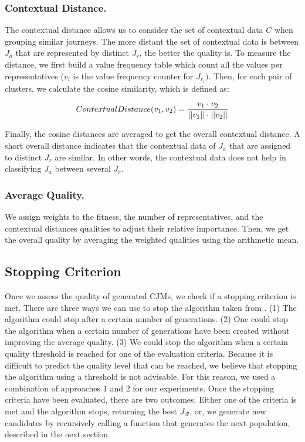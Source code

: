 \documentclass[runningheads]{llncs}
\begin{document}
{%
\label{contextual-distance}
\subsubsection{Contextual Distance.} The contextual distance allows us to consider the set of contextual data $C$ when grouping similar journeys. The more distant the set of contextual data is between $J_a$ that are represented by distinct $J_r$, the better the quality is. To measure the distance, we first build a value frequency table which count all the values per representatives (${v_i}$ is the value frequency counter for $J_{r_i})$. Then, for each pair of clusters, we calculate the cosine similarity, which is defined as:

\begin{equation}
\footnotesize
    ContextualDistance({v_{1}}, {v_{2}}) = \frac{v_{1} \cdot v_{2}}{||v_{1} ||\cdot||v_{2}||} 
\end{equation}

Finally, the cosine distances are averaged to get the overall contextual distance. A short overall distance indicates that the contextual data of $J_a$ that are assigned to distinct $J_r$ are similar. In other words, the contextual data does not help in classifying $J_a$ between several $J_r$. 

\subsubsection{Average Quality. } We assign weights to the fitness, the number of representatives, and the contextual distances qualities to adjust their relative importance. Then, we get the overall quality by averaging the weighted qualities using the arithmetic mean. 

\subsection{Stopping Criterion}
{Once we assess the quality of generated CJMs, we check if a stopping criterion is met.} There are three ways we can use to stop the algorithm taken from \cite{buijs2012genetic,de2005genetic}. (1) The algorithm could stop after a certain number of generations. (2) One could stop the algorithm when a certain number of generations have been created without improving the average quality. (3) We could stop the algorithm when a certain quality threshold is reached for one of the evaluation criteria. Because it is difficult to predict the quality level that can be reached, we believe that stopping the algorithm using a threshold is not advisable. For this reason, we used a combination of approaches 1 and 2 for our experiments. Once the stopping criteria have been evaluated, there are two outcomes. Either one of the criteria is met and the algorithm stops, returning the best $J_{\mathcal{R}}$, or, {we generate new candidates} by recursively calling a function that generates the next population, described in the next section.

}
\end{document}
